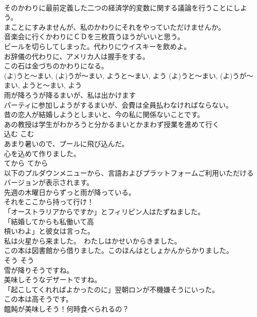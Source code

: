 \documentclass[8pt]{extreport}
\begin{document}
\begin{CJK}{UTF8}{min}
\\	そのかわりに最前定義した二つの経済学的変数に関する議論を行うことにしよう。   
\\	まことにすみませんが、私のかわりにそれをやっていただけませんか。  
\\	音楽会に行くかわりにＣＤを三枚買うほうがいいと思う。  
\\	ビールを切らしてしまった。代わりにウイスキーを飲めよ。  
\\	お辞儀の代わりに、アメリカ人は握手をする。   
\\	この石は金づちのかわりになる。  
\\	(よ)うと〜まい, (よ)うが〜まい, ようと〜まい, よう	(よ)うと〜まい, (よ)うが〜まい, ようと〜まい, よう	
\\	雨が降ろうが降るまいが、私は出かけます  
\\	パーティに参加しようがするまいが、会費は全員払わなければならない。   
\\	昔の恋人が結婚しようとしまいと、今の私に関係ないことです。  
\\	あの教授は学生がわかろうと分かるまいとかまわず授業を進めて行く   
\\	込む	こむ	
\\	あまり暑いので、プールに飛び込んだ。   
\\	心を込めて作りました。  
\\	てから	てから	
\\	以下のプルダウンメニューから、言語およびプラットフォームご利用いただけるバージョンが表示されます。   
\\	先週の木曜日からずっと雨が降っている。   
\\	それをここから持って行け！  
\\	「オーストラリアからですか」とフィリピン人はたずねました。  
\\	「結婚してからも私働いて高
\\	槓いわよ」と彼女は言った。  
\\	私は火星から来ました。　わたしはかせいからきました。  
\\	この本は図書館から借りました。このほんはとしょかんからかりました。  
\\	そう	そう	
\\	雪が降りそうですね。  
\\	美味しそうなデザートですね。  
\\	「起こしてくれればよかったのに」翌朝ロンが不機嫌そうにいった。  
\\	この本は高そうです。  
\\	饂飩が美味しそう！何時食べられるの？  

\end{CJK}
\end{document}
